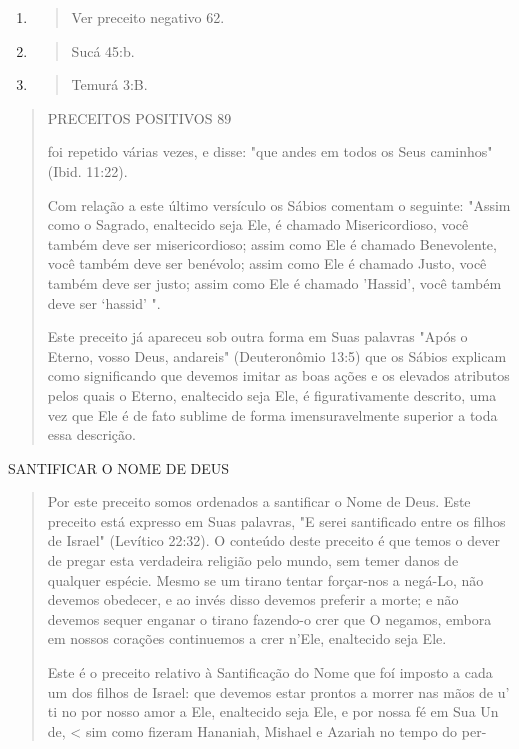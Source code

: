 \begin{enumerate}
\def\labelenumi{\arabic{enumi}.}
\setcounter{enumi}{30}
\item
  \begin{quote}
  Ver preceito negativo 62.
  \end{quote}
\item
  \begin{quote}
  Sucá 45:b.
  \end{quote}
\item
  \begin{quote}
  Temurá 3:B.
  \end{quote}
\end{enumerate}

\begin{quote}
PRECEITOS POSITIVOS 89

foi repetido várias vezes, e disse: "que andes em todos os Seus
caminhos" (Ibid. 11:22).

Com relação a este último versículo os Sábios comentam o seguinte:
"Assim como o Sagrado, enaltecido seja Ele, é chamado Misericordioso,
você também deve ser misericordioso; assim como Ele é chamado
Benevolente, vo­cê também deve ser benévolo; assim como Ele é chamado
Justo, você também deve ser justo; assim como Ele é chamado 'Hassid',
você também deve ser `hassid' ".

Este preceito já apareceu sob outra forma em Suas palavras "Após o
Eterno, vosso Deus, andareis" (Deuteronômio 13:5) que os Sábios explicam
como significando que devemos imitar as boas ações e os elevados
atributos pelos quais o Eterno, enaltecido seja Ele, é figurativamente
descrito, uma vez que Ele é de fato sublime de forma imensuravelmente
superior a toda essa descrição.
\end{quote}

SANTIFICAR O NOME DE DEUS

\begin{quote}
Por este preceito somos ordenados a santificar o Nome de Deus. Es­te
preceito está expresso em Suas palavras, "E serei santificado entre os
filhos de Israel" (Levítico 22:32). O conteúdo deste preceito é que
temos o dever de pregar esta verdadeira religião pelo mundo, sem temer
danos de qualquer es­pécie. Mesmo se um tirano tentar forçar-nos a
negá-Lo, não devemos obede­cer, e ao invés disso devemos preferir a
morte; e não devemos sequer enganar o tirano fazendo-o crer que O
negamos, embora em nossos corações continue­mos a crer n'Ele, enaltecido
seja Ele.

Este é o preceito relativo à Santificação do Nome que foí imposto a cada
um dos filhos de Israel: que devemos estar prontos a morrer nas mãos de
u' ti no por nosso amor a Ele, enaltecido seja Ele, e por nossa fé em
Sua Un de, \textless{} sim como fizeram Hananiah, Mishael e Azariah no
tempo do per-
\end{quote}

